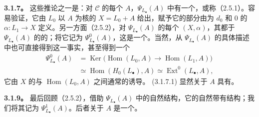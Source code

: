 \textbf{3.1.7。} 这些推论之一是：对 $\mathcal C$ 的每个 $A$，$\Psi_{L_\bullet}(A)$ 中有一个，或称（2.5.1）。容易验证，它由 $L_0$ 以 $A$ 为核的 $X=L_0+A$ 给出，赋予它的部分由为 $d_0$ 和 $0$ 的 $\alpha:L_1\to X$ 定义。另一方面（2.5.2），对 $\Psi_{L_\bullet}(A)$ 的每个 $(X,\alpha)$，其都于 $\Psi_{L_\bullet}(A)$ 的的；将它记为 $\Psi^0_{L_\bullet}(A)$，这是一个。当然，从 $\Psi_{L_\bullet}(A)$ 的具体描述中也可直接得到这一事实，甚至得到一个
\[
\begin{aligned}
\Psi^0_{L_\bullet}(A)
&=\operatorname{Ker}\bigl(\operatorname{Hom}(L_0,A)\longrightarrow\operatorname{Hom}(L_1,A)\bigr)\\
&\simeq\operatorname{Hom}(H_0(L_\bullet),A)\simeq\operatorname{Ext}^0(L_\bullet,A),
\end{aligned}\tag{3.1.8}
\]
它由 $X$ 的与 $\operatorname{Hom}(L_0,A)$ 之间通常的诱导。 (3.1.7.1) 显然关于 $A$ 具有。

\textbf{3.1.9。} 最后回顾（2.5.2），借助 $\Psi_{L_\bullet}(A)$ 中的自然结构，它的自然带有结构；我们将其记为 $\Psi^1_{L_\bullet}(A)$。后者关于 $A$ 是一个。

